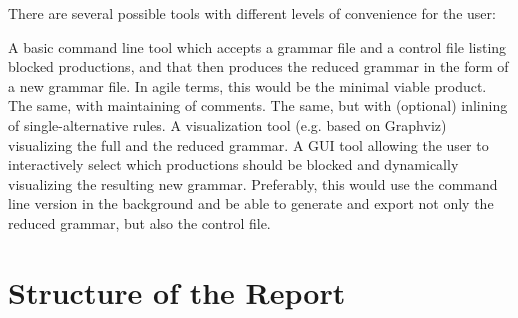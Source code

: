 There are several possible tools with different levels of convenience for the user:

A basic command line tool which accepts a grammar file and a control file listing blocked productions, and that then produces the reduced grammar in the form of a new grammar file. In agile terms, this would be the minimal viable product.
The same, with maintaining of comments.
The same, but with (optional) inlining of single-alternative rules.
A visualization tool (e.g. based on Graphviz) visualizing the full and the reduced grammar.
A GUI tool allowing the user to interactively select which productions should be blocked and dynamically visualizing the resulting new grammar. Preferably, this would use the command line version in the background and be able to generate and export not only the reduced grammar, but also the control file.
\section{Structure of the Report}\label{sec:Structure}
